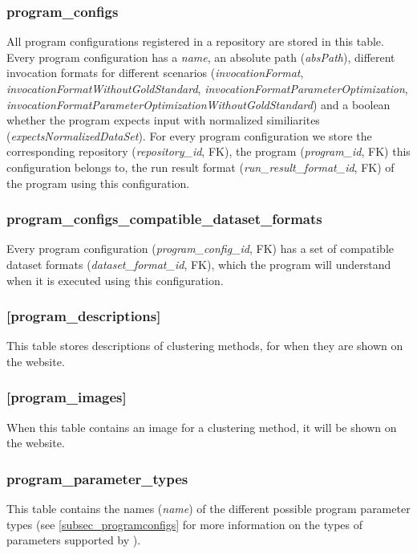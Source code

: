 	\subsubsection{program\_configs                                              } All program configurations registered in a repository are stored in this table. Every program configuration has a \textit{name}, an absolute path (\textit{absPath}), different invocation formats for different scenarios (\textit{invocationFormat}, \textit{invocationFormatWithoutGoldStandard}, \textit{invocationFormatParameterOptimization}, \textit{invocationFormatParameterOptimizationWithoutGoldStandard}) and a boolean whether the program expects input with normalized similiarites (\textit{expectsNormalizedDataSet}). For every program configuration we store the corresponding repository (\textit{repository\_id}, FK), the program (\textit{program\_id}, FK) this configuration belongs to, the run result format (\textit{run\_result\_format\_id}, FK) of the program using this configuration. 
	
	\subsubsection{program\_configs\_compatible\_dataset\_formats                   } Every program configuration (\textit{program\_config\_id}, FK) has a set of compatible dataset formats (\textit{dataset\_format\_id}, FK), which the program will understand when it is executed using this configuration.
	
	\subsubsection{[program\_descriptions]}
	This table stores descriptions of clustering methods, for when they are shown on the website.
	
	\subsubsection{[program\_images]}
	When this table contains an image for a clustering method, it will be shown on the website.
	
	\subsubsection{program\_parameter\_types}
	This table contains the names (\textit{name}) of the different possible program parameter types (see \ref{subsec_programconfigs} for more information on the types of parameters supported by \clusteval).
	
